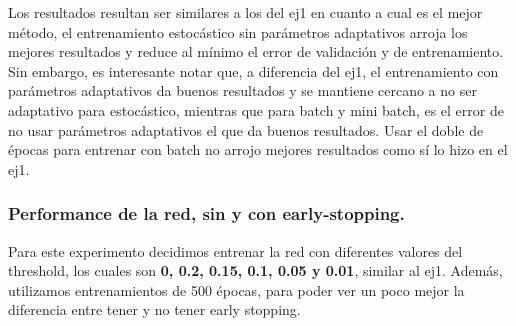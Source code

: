 Los resultados resultan ser similares a los del ej1 en cuanto a cual es el mejor método, el entrenamiento estocástico sin parámetros adaptativos arroja 
los mejores resultados y reduce al mínimo el error de validación y de entrenamiento. Sin embargo, es interesante notar que, a diferencia del ej1, el 
entrenamiento con parámetros adaptativos da buenos resultados y se mantiene cercano a no ser adaptativo para estocástico, mientras que para batch y 
mini batch, es el error de no usar parámetros adaptativos el que da buenos resultados. Usar el doble de épocas para entrenar con batch no arrojo 
mejores resultados como sí lo hizo en el ej1.

\subsubsection{Performance de la red, sin y con early-stopping.}

Para este experimento decidimos entrenar la red con diferentes valores del threshold, los cuales son \textbf{0, 0.2, 0.15, 0.1, 0.05 y 0.01}, similar 
al ej1. Además, utilizamos entrenamientos de 500 épocas, para poder ver un poco mejor la diferencia entre tener y no tener early stopping.


